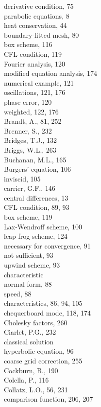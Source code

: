 \documentclass[10pt]{article}
\begin{document}
derivative condition, 75\\
parabolic equations, 8\\
heat conservation, 44\\
boundary-fitted mesh, 80\\
box scheme, 116\\
CFL condition, 119\\
Fourier analysis, 120\\
modified equation analysis, 174\\
numerical example, 121\\
oscillations, 121, 176\\
phase error, 120\\
weighted, 122, 176\\
Brandt, A., 81, 252\\
Brenner, S., 232\\
Bridges, T.J., 132\\
Briggs, W.L., 263\\
Buchanan, M.L., 165\\
Burgers' equation, 106\\
inviscid, 105\\
carrier, G.F., 146\\
central differences, 13\\
CFL condition, 89, 93\\
box scheme, 119\\
Lax-Wendroff scheme, 100\\
leap-frog scheme, 124\\
necessary for convergence, 91\\
not sufficient, 93\\
upwind scheme, 93\\
characteristic\\
normal form, 88\\
speed, 88\\
characteristics, 86, 94, 105\\
chequerboard mode, 118, 174\\
Cholesky factors, 260\\
Ciarlet, P.G., 232\\
classical solution\\
hyperbolic equation, 96\\
coarse grid correction, 255\\
Cockburn, B., 190\\
Colella, P., 116\\
Collatz, L.O., 56, 231\\
comparison function, 206, 207\\
\end{document}
